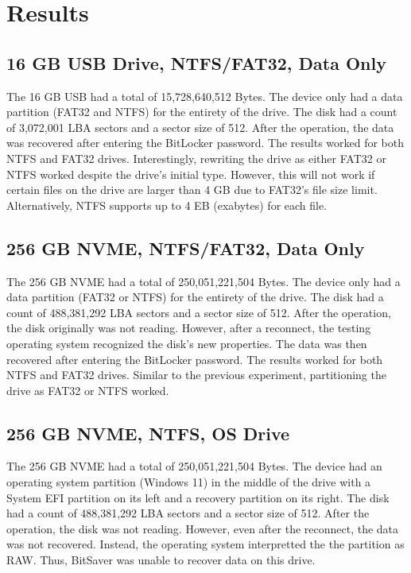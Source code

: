\documentclass[conference]{IEEEtran} \IEEEoverridecommandlockouts
\begin{document}
\section{Results}

\subsection{16 GB USB Drive, NTFS/FAT32, Data Only}

The 16 GB USB had a total of 15,728,640,512 Bytes. The device only had a data partition (FAT32 and NTFS) for the entirety of the drive. The disk had
a count of 3,072,001 LBA sectors and a sector size of 512. After the operation, the data was recovered after entering the BitLocker password.
The results worked for both NTFS and FAT32 drives. Interestingly, rewriting the drive as either FAT32 or NTFS worked despite the drive's initial type. However, this will not work
if certain files on the drive are larger than 4 GB due to FAT32's file size limit. Alternatively, NTFS supports up to 4 EB (exabytes) for each file.

\subsection{256 GB NVME, NTFS/FAT32, Data Only}

The 256 GB NVME had a total of 250,051,221,504 Bytes. The device only had a data partition (FAT32 or NTFS) for the entirety of the drive. The disk had
a count of 488,381,292 LBA sectors and a sector size of 512. After the operation, the disk originally was
not reading. However, after a reconnect, the testing operating system recognized the disk's new properties. The data was then recovered after entering the BitLocker password.
The results worked for both NTFS and FAT32 drives. Similar to the previous experiment, partitioning the drive as FAT32 or NTFS worked.

\subsection{256 GB NVME, NTFS, OS Drive}

The 256 GB NVME had a total of 250,051,221,504 Bytes. The device had an operating system partition (Windows 11) in the middle of the drive with a System EFI partition on its
left and a recovery partition on its right. The disk had a count of 488,381,292 LBA sectors and a sector size of 512. After the operation, the disk was not reading. However,
even after the reconnect, the data was not recovered. Instead, the operating system interpretted the 
the partition as RAW. Thus, BitSaver was unable to recover data on this drive.
\end{document}
